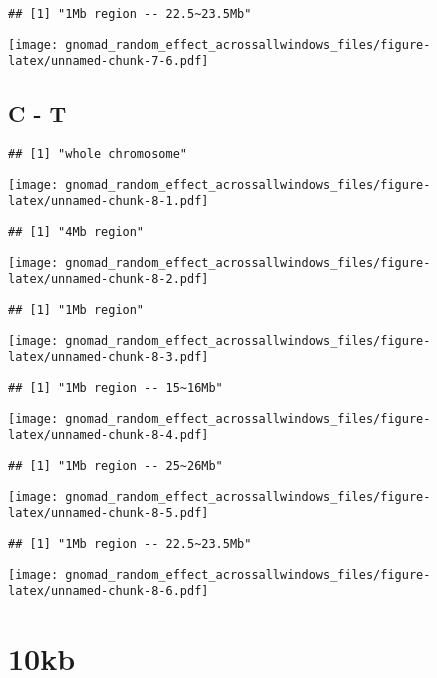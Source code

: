 \documentclass[
]{article}
\begin{document}
\begin{verbatim}
## [1] "1Mb region -- 22.5~23.5Mb"
\end{verbatim}

\texttt{[image: gnomad\_random\_effect\_acrossallwindows\_files/figure-latex/unnamed-chunk-7-6.pdf]}

\hypertarget{c---t}{%
\subsection{C - T}\label{c---t}}

\begin{verbatim}
## [1] "whole chromosome"
\end{verbatim}

\texttt{[image: gnomad\_random\_effect\_acrossallwindows\_files/figure-latex/unnamed-chunk-8-1.pdf]}

\begin{verbatim}
## [1] "4Mb region"
\end{verbatim}

\texttt{[image: gnomad\_random\_effect\_acrossallwindows\_files/figure-latex/unnamed-chunk-8-2.pdf]}

\begin{verbatim}
## [1] "1Mb region"
\end{verbatim}

\texttt{[image: gnomad\_random\_effect\_acrossallwindows\_files/figure-latex/unnamed-chunk-8-3.pdf]}

\begin{verbatim}
## [1] "1Mb region -- 15~16Mb"
\end{verbatim}

\texttt{[image: gnomad\_random\_effect\_acrossallwindows\_files/figure-latex/unnamed-chunk-8-4.pdf]}

\begin{verbatim}
## [1] "1Mb region -- 25~26Mb"
\end{verbatim}

\texttt{[image: gnomad\_random\_effect\_acrossallwindows\_files/figure-latex/unnamed-chunk-8-5.pdf]}

\begin{verbatim}
## [1] "1Mb region -- 22.5~23.5Mb"
\end{verbatim}

\texttt{[image: gnomad\_random\_effect\_acrossallwindows\_files/figure-latex/unnamed-chunk-8-6.pdf]}

\hypertarget{kb-1}{%
\section{10kb}\label{kb-1}}
\end{document}

